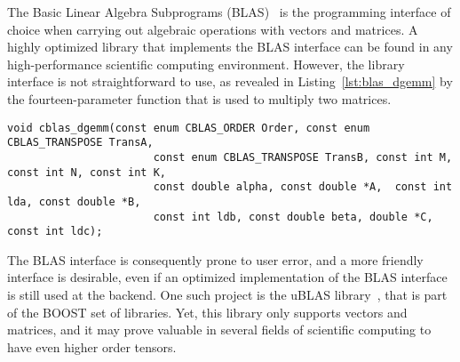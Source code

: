 \documentclass[11pt]{article}
\def\ifmonospace{\ifdim\fontdimen3\font=0pt }
\def\C++{\ifmonospace C++\else C\kern-.1667em\raise.50ex\hbox{\tiny{\textbf{+}\kern-.1em\textbf{+}}}\fi \spacefactor1000 }
\begin{document}
The Basic Linear Algebra Subprograms (BLAS)~\cite{Lawson:1979, Dongarra:1988, Dongarra:1990} is the programming interface of choice when carrying out algebraic operations with vectors and matrices. A highly optimized library that implements the BLAS interface can be found in any high-performance scientific computing environment. However, the library interface is not straightforward to use, as revealed in Listing~\ref{lst:blas_dgemm} by the fourteen-parameter function that is used to multiply two matrices.
\begin{lstlisting}[caption={Level 3 BLAS cblas\_dgemm function}, label=lst:blas_dgemm]
void cblas_dgemm(const enum CBLAS_ORDER Order, const enum CBLAS_TRANSPOSE TransA,
                       const enum CBLAS_TRANSPOSE TransB, const int M, const int N, const int K,
                       const double alpha, const double *A,  const int lda, const double *B, 
                       const int ldb, const double beta, double *C, const int ldc);                 
\end{lstlisting}
The BLAS interface is consequently prone to user error, and a more friendly interface is desirable, even if an optimized implementation of the BLAS interface is still used at the backend.
One such project is the uBLAS library~\cite{ublas:2002}, that is part of the BOOST set of \C++ libraries. Yet, this library only supports vectors and matrices, and it may prove valuable in several fields of scientific computing to have even higher order tensors.
\end{document}

